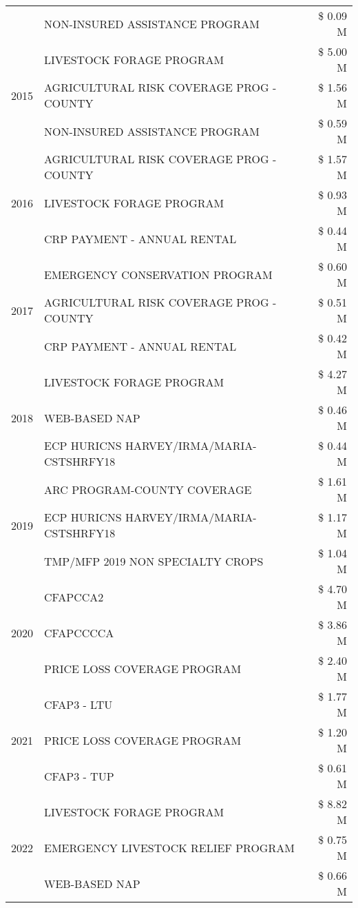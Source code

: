 \begin{tabular}{llr}
 & NON-INSURED ASSISTANCE PROGRAM & \$ 0.09 M \\
\cline{1-3}
\multirow[t]{3}{*}{2015} & LIVESTOCK FORAGE PROGRAM & \$ 5.00 M \\
 & AGRICULTURAL RISK COVERAGE PROG - COUNTY & \$ 1.56 M \\
 & NON-INSURED ASSISTANCE PROGRAM & \$ 0.59 M \\
\cline{1-3}
\multirow[t]{3}{*}{2016} & AGRICULTURAL RISK COVERAGE PROG - COUNTY & \$ 1.57 M \\
 & LIVESTOCK FORAGE PROGRAM & \$ 0.93 M \\
 & CRP PAYMENT - ANNUAL RENTAL & \$ 0.44 M \\
\cline{1-3}
\multirow[t]{3}{*}{2017} & EMERGENCY CONSERVATION PROGRAM & \$ 0.60 M \\
 & AGRICULTURAL RISK COVERAGE PROG - COUNTY & \$ 0.51 M \\
 & CRP PAYMENT - ANNUAL RENTAL & \$ 0.42 M \\
\cline{1-3}
\multirow[t]{3}{*}{2018} & LIVESTOCK FORAGE PROGRAM & \$ 4.27 M \\
 & WEB-BASED NAP & \$ 0.46 M \\
 & ECP HURICNS HARVEY/IRMA/MARIA-CSTSHRFY18 & \$ 0.44 M \\
\cline{1-3}
\multirow[t]{3}{*}{2019} & ARC PROGRAM-COUNTY COVERAGE & \$ 1.61 M \\
 & ECP HURICNS HARVEY/IRMA/MARIA-CSTSHRFY18 & \$ 1.17 M \\
 & TMP/MFP 2019 NON SPECIALTY CROPS & \$ 1.04 M \\
\cline{1-3}
\multirow[t]{3}{*}{2020} & CFAPCCA2 & \$ 4.70 M \\
 & CFAPCCCCA & \$ 3.86 M \\
 & PRICE LOSS COVERAGE PROGRAM & \$ 2.40 M \\
\cline{1-3}
\multirow[t]{3}{*}{2021} & CFAP3 - LTU & \$ 1.77 M \\
 & PRICE LOSS COVERAGE PROGRAM & \$ 1.20 M \\
 & CFAP3 - TUP & \$ 0.61 M \\
\cline{1-3}
\multirow[t]{3}{*}{2022} & LIVESTOCK FORAGE PROGRAM & \$ 8.82 M \\
 & EMERGENCY LIVESTOCK RELIEF PROGRAM & \$ 0.75 M \\
 & WEB-BASED NAP & \$ 0.66 M \\
\cline{1-3}
\bottomrule
\end{tabular}

